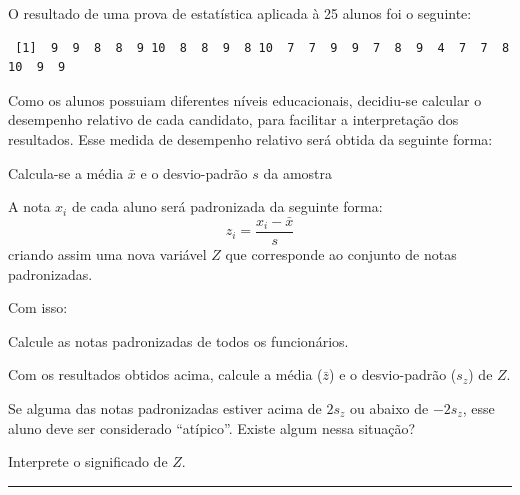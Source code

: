 \documentclass[a4paper,11pt,fleqn]{article}\usepackage[]{graphicx}\usepackage[]{color}
\makeatletter
\newenvironment{kframe}{%
 \def\at@end@of@kframe{}%
 \ifinner\ifhmode%
  \def\at@end@of@kframe{\end{minipage}}%
  \begin{minipage}{\columnwidth}%
 \fi\fi%
 \def\FrameCommand##1{\hskip\@totalleftmargin \hskip-\fboxsep
 \colorbox{shadecolor}{##1}\hskip-\fboxsep
     \hskip-\linewidth \hskip-\@totalleftmargin \hskip\columnwidth}%
 \MakeFramed {\advance\hsize-\width
   \@totalleftmargin\z@ \linewidth\hsize
   \@setminipage}}%
 {\par\unskip\endMakeFramed%
 \at@end@of@kframe}
\newenvironment{knitrout}{}{} %
\theoremstyle{definition}
\makeatother
\begin{document}
\begin{compactenum}[9.] %
\item O resultado de uma prova de estatística aplicada à 25 alunos foi o
  seguinte:
\begin{knitrout}\small
{}\color{fgcolor}\begin{kframe}
\begin{verbatim}
 [1]  9  9  8  8  9 10  8  8  9  8 10  7  7  9  9  7  8  9  4  7  7  8 10  9  9
\end{verbatim}
\end{kframe}
\end{knitrout}
Como os alunos possuiam diferentes níveis educacionais, decidiu-se
calcular o desempenho relativo de cada candidato, para facilitar a
interpretação dos resultados. Esse medida de desempenho relativo será
obtida da seguinte forma:
\begin{compactenum}[1.]
\item Calcula-se a média $\bar{x}$ e o desvio-padrão $s$ da amostra
\item A nota $x_i$ de cada aluno será padronizada da seguinte forma:
  \begin{equation*}
    z_i = \frac{x_i - \bar{x}}{s}
  \end{equation*}
  criando assim uma nova variável $Z$ que corresponde ao conjunto de
  notas padronizadas.
\end{compactenum}
Com isso:
\begin{compactenum}
\item Calcule as notas padronizadas de todos os funcionários.

\item Com os resultados obtidos acima, calcule a média ($\bar{z}$) e o
  desvio-padrão ($s_z$) de $Z$.

\item Se alguma das notas padronizadas estiver acima de $2s_z$ ou
  abaixo de $-2s_z$, esse aluno deve ser considerado ``atípico''.
  Existe algum nessa situação?

\item Interprete o significado de $Z$.
\end{compactenum}
\end{compactenum}

\vspace{0.3cm}
\hrule
\vspace{0.3cm}
\end{document}
